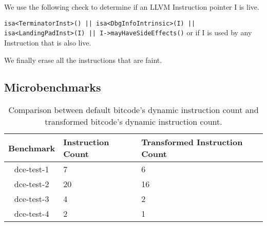 We use the following check to determine if an LLVM Instruction pointer I is live.

\texttt{isa<TerminatorInst>() || isa<DbgInfoIntrinsic>(I) || \\  isa<LandingPadInst>(I) || I->mayHaveSideEffects()} or if I is used by any Instruction that is also live. 

We finally erase all the instructions that are faint.

\subsection{Microbenchmarks}

\begin{table}[!ht]
\centering
\begin{tabular}{c|l|l}
  \toprule
  \textbf{Benchmark} & \textbf{Instruction Count} & \textbf{Transformed Instruction Count} \\
  \midrule
  dce-test-1 & 7  & 6  \\ 
  dce-test-2 & 20 & 16 \\
  dce-test-3 & 4  & 2  \\
  dce-test-4 & 2  & 1  \\
  \bottomrule
\end{tabular}
\caption{Comparison between default bitcode's dynamic instruction count and transformed
  bitcode's dynamic instruction count.}
\end{table}  

\newpage

